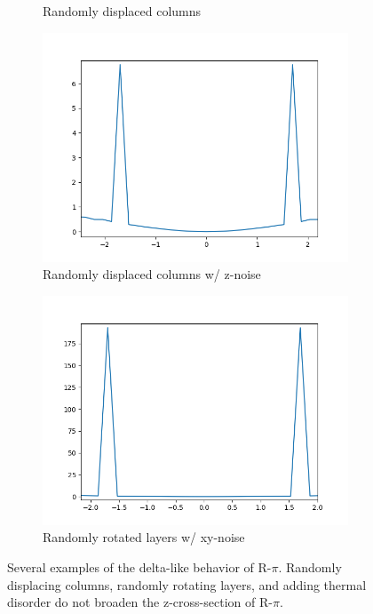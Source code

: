 \documentclass{article}
\begin{document}
\begin{figure}
\begin{subfigure}{0.45\textwidth}
  \caption{Randomly displaced columns}\label{fig:displaced_columns_rpi}
  \end{subfigure}
  \begin{subfigure}{0.45\textwidth}
  \includegraphics[width=\textwidth]{displaced_columns_z_noise_rpi.png}
  \caption{Randomly displaced columns w/ z-noise}\label{fig:displaced_columns_z_noise_rpi}
  \end{subfigure}
  \begin{subfigure}{0.45\textwidth}
  \includegraphics[width=\textwidth]{rotated_layers_rpi_xy_noise.png}
  \caption{Randomly rotated layers w/ xy-noise}\label{fig:rotated_layers_rpi_xy_noise}
  \end{subfigure}
  \caption{Several examples of the delta-like behavior of R-$\pi$. Randomly displacing
  columns, randomly rotating layers, and adding thermal disorder do not broaden 
  the z-cross-section of R-$\pi$.}\label{fig:deltas}
  \end{figure}
\end{document}

